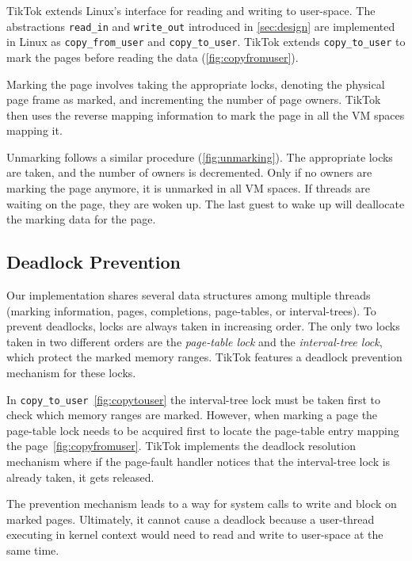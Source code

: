 \documentclass[conference]{IEEEtran}
\newcommand{\sysname}{TikTok}
\begin{document}
\sysname{} extends Linux's interface for reading and writing to user-space. The
abstractions \texttt{read\_in} and \texttt{write\_out} introduced in
\autoref{sec:design} are implemented in Linux as \texttt{copy\_from\_user} and
\texttt{copy\_to\_user}. \sysname{} extends \texttt{copy\_to\_user} to mark the pages
before reading the data (\autoref{fig:copyfromuser}).

Marking the page involves taking the appropriate locks, denoting the physical
page frame as marked, and incrementing the number of page owners. \sysname{} then
uses the reverse mapping information to mark the page in all the VM spaces
mapping it.

Unmarking follows a similar procedure (\autoref{fig:unmarking}). The appropriate
locks are taken, and the number of owners is decremented. Only if no owners are
marking the page anymore, it is unmarked in all VM spaces. If threads are
waiting on the page, they are woken up. The last guest to wake up will
deallocate the marking data for the page.


\subsection{Deadlock Prevention} \label{subsec:deadlockprevention}

Our implementation shares several data structures among multiple threads
(marking information, pages, completions, page-tables, or interval-trees).  To
prevent deadlocks, locks are always taken in increasing order.  The only two
locks taken in two different orders are the \emph{page-table lock} and the
\emph{interval-tree lock}, which protect the marked memory ranges. \sysname{}
features a deadlock prevention mechanism for these locks.


In \texttt{copy\_to\_user}~\autoref{fig:copytouser} the interval-tree lock must
be taken first to check which memory ranges are marked. However, when marking a
page the page-table lock needs to be acquired first to locate the page-table
entry mapping the page~\autoref{fig:copyfromuser}. \sysname{} implements the
deadlock resolution mechanism where if the page-fault handler notices that the
interval-tree lock is already taken, it gets released.

The prevention mechanism leads to a way for system calls to write and block
on marked pages. Ultimately, it cannot cause a deadlock because a 
user-thread executing in kernel context would
need to read and write to user-space at the same time. 
\end{document}
